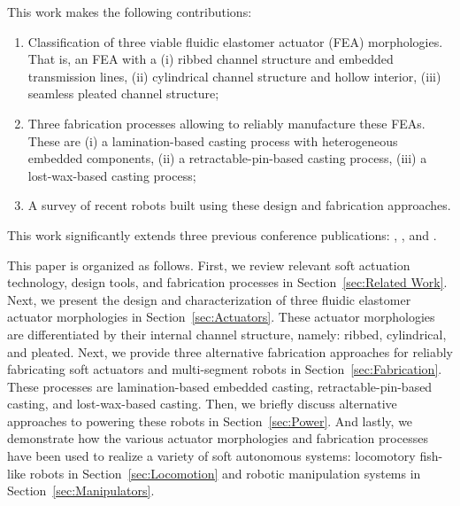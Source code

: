This work makes the following contributions:
\begin{enumerate}
 \item Classification of three viable fluidic elastomer actuator (FEA) morphologies. That is, an FEA with a (i) ribbed channel structure and embedded transmission lines, (ii) cylindrical channel structure and hollow interior, (iii) seamless pleated channel structure;
 \item Three fabrication processes allowing to reliably manufacture these FEAs. These are (i) a lamination-based casting process with heterogeneous embedded components, (ii) a retractable-pin-based casting process, (iii) a lost-wax-based casting process; 
 \item A survey of recent robots built using these design and fabrication approaches.
\end{enumerate}
This work significantly extends three previous conference publications: \citep{marchese2014design}, \citep{marchese2014whole}, and \citep{katzschmann2015autonomous}.

This paper is organized as follows. 
First, we review relevant soft actuation technology, design tools, and fabrication processes in Section~\ref{sec:Related Work}.
%
Next, we present the design and characterization of three fluidic elastomer actuator morphologies in Section~\ref{sec:Actuators}.
%
These actuator morphologies are differentiated by their internal channel structure, namely: ribbed, cylindrical, and pleated.
%
Next, we provide three alternative fabrication approaches for reliably fabricating soft actuators and multi-segment robots in Section~\ref{sec:Fabrication}.
%
These processes are lamination-based embedded casting, retractable-pin-based casting, and lost-wax-based casting.
%
Then, we briefly discuss alternative approaches to powering these robots in Section~\ref{sec:Power}.
%
And lastly, we demonstrate how the various actuator morphologies and fabrication processes have been used to realize a variety of soft autonomous systems: locomotory fish-like robots in Section~\ref{sec:Locomotion} and robotic manipulation systems in Section~\ref{sec:Manipulators}.